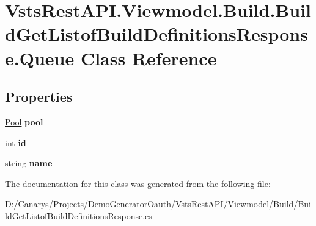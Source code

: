 \hypertarget{class_vsts_rest_a_p_i_1_1_viewmodel_1_1_build_1_1_build_get_listof_build_definitions_response_1_1_queue}{}\section{Vsts\+Rest\+A\+P\+I.\+Viewmodel.\+Build.\+Build\+Get\+Listof\+Build\+Definitions\+Response.\+Queue Class Reference}
\label{class_vsts_rest_a_p_i_1_1_viewmodel_1_1_build_1_1_build_get_listof_build_definitions_response_1_1_queue}
\subsection*{Properties}
\begin{DoxyCompactItemize}
\item 
\mbox{\label{class_vsts_rest_a_p_i_1_1_viewmodel_1_1_build_1_1_build_get_listof_build_definitions_response_1_1_queue_a2dc082008a07ca9574e15c12c4cc253f}} 
\mbox{\hyperlink{class_vsts_rest_a_p_i_1_1_viewmodel_1_1_build_1_1_build_get_listof_build_definitions_response_1_1_pool}{Pool}} {\bfseries pool}
\item 
\mbox{\label{class_vsts_rest_a_p_i_1_1_viewmodel_1_1_build_1_1_build_get_listof_build_definitions_response_1_1_queue_a60263c65260d552ae98f1af0c2d7786c}} 
int {\bfseries id}
\item 
\mbox{\label{class_vsts_rest_a_p_i_1_1_viewmodel_1_1_build_1_1_build_get_listof_build_definitions_response_1_1_queue_aaa3f1bb55d4b4e80d625d401ba755a1d}} 
string {\bfseries name}
\end{DoxyCompactItemize}


The documentation for this class was generated from the following file\+:\begin{DoxyCompactItemize}
\item 
D\+:/\+Canarys/\+Projects/\+Demo\+Generator\+Oauth/\+Vsts\+Rest\+A\+P\+I/\+Viewmodel/\+Build/Build\+Get\+Listof\+Build\+Definitions\+Response.\+cs\end{DoxyCompactItemize}
